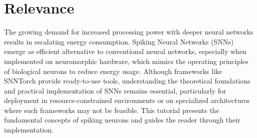 \section*{Relevance}
	\par The growing demand for increased processing power with deeper neural networks results in escalating energy consumption. Spiking Neural Networks (SNNs) emerge as efficient alternative to conventional neural networks, especially when implemented on neuromorphic hardware, which mimics the operating principles of biological neurons to reduce energy usage. Although frameworks like SNNTorch provide ready-to-use tools, understanding the theoretical foundations and practical implementation of SNNs remains essential, particularly for deployment in resource-constrained environments or on specialized architectures where such frameworks may not be feasible. This tutorial presents the fundamental concepts of spiking neurons and guides the reader through their implementation.